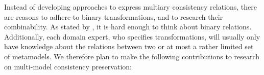 Instead of developing approaches to express multiary consistency relations, there are reasons to adhere to binary transformations, and to research their combinability.
As stated by \textcite{stevens2017a}, %
it is hard enough to think about binary relations. %
Additionally, each domain expert, who specifies transformations, %
will usually only have knowledge about the relations between two or at most a rather limited set of metamodels. %
We therefore plan to make the following contributions to research on multi-model consistency preservation:
